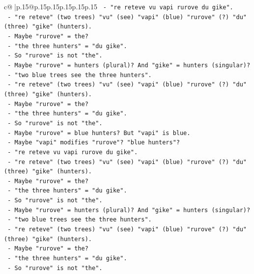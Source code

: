 \documentclass{article}
\begin{document}
{\begin{supertabular}{c@{$\;$}|p{.15\linewidth}@{}p{.15\linewidth}p{.15\linewidth}p{.15\linewidth}p{.15\linewidth}p{.15\linewidth}}
{{{\texttt{           {-} "re reteve vu vapi rurove du gike".} \\
\texttt{           {-} "re reteve" (two trees) "vu" (see) "vapi" (blue) "rurove" (?) "du" (three) "gike" (hunters).} \\
\texttt{           {-} Maybe "rurove" = the?} \\
\texttt{           {-} "the three hunters" = "du gike".} \\
\texttt{           {-} So "rurove" is not "the".} \\
\texttt{           {-} Maybe "rurove" = hunters (plural)? And "gike" = hunters (singular)?} \\
\texttt{           {-} "two blue trees see the three hunters".} \\
\texttt{           {-} "re reteve" (two trees) "vu" (see) "vapi" (blue) "rurove" (?) "du" (three) "gike" (hunters).} \\
\texttt{           {-} Maybe "rurove" = the?} \\
\texttt{           {-} "the three hunters" = "du gike".} \\
\texttt{           {-} So "rurove" is not "the".} \\
\texttt{           {-} Maybe "rurove" = blue hunters? But "vapi" is blue.} \\
\texttt{           {-} Maybe "vapi" modifies "rurove"? "blue hunters"?} \\
\texttt{           {-} "re reteve vu vapi rurove du gike".} \\
\texttt{           {-} "re reteve" (two trees) "vu" (see) "vapi" (blue) "rurove" (?) "du" (three) "gike" (hunters).} \\
\texttt{           {-} Maybe "rurove" = the?} \\
\texttt{           {-} "the three hunters" = "du gike".} \\
\texttt{           {-} So "rurove" is not "the".} \\
\texttt{           {-} Maybe "rurove" = hunters (plural)? And "gike" = hunters (singular)?} \\
\texttt{           {-} "two blue trees see the three hunters".} \\
\texttt{           {-} "re reteve" (two trees) "vu" (see) "vapi" (blue) "rurove" (?) "du" (three) "gike" (hunters).} \\
\texttt{           {-} Maybe "rurove" = the?} \\
\texttt{           {-} "the three hunters" = "du gike".} \\
\texttt{           {-} So "rurove" is not "the".} \\
}}}
\end{supertabular}}
\end{document}
